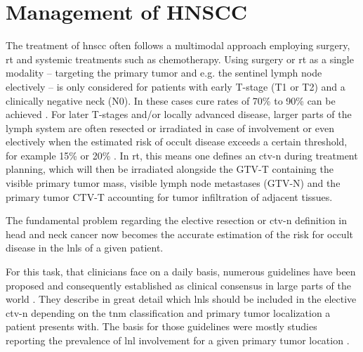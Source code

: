 \documentclass[\relativeRoot/main.tex]{subfiles}
\begin{document}
\section{Management of HNSCC}
\label{sec:intro:management}

The treatment of \gls{hnscc} often follows a multimodal approach employing surgery, \gls{rt} and systemic treatments such as chemotherapy. Using surgery or \acrlong{rt} as a single modality -- targeting the primary tumor and e.g. the sentinel lymph node electively -- is only considered for patients with early T-stage (T1 or T2) and a clinically negative neck (N0). In these cases cure rates of 70\% to 90\% can be achieved \cite{pfister_head_2014}. For later T-stages and/or locally advanced disease, larger parts of the lymph system are often resected or irradiated in case of involvement or even electively when the estimated risk of occult disease exceeds a certain threshold, for example 15\% or 20\% \cite{weiss_use_1997,pitman_rationale_2000,pillsbury_iii_rationale_1997}. In \acrlong{rt}, this means one defines an \gls{ctv-n} during treatment planning, which will then be irradiated alongside the GTV-T containing the visible primary tumor mass, visible lymph node metastases (GTV-N) and the primary tumor CTV-T accounting for tumor infiltration of adjacent tissues.

The fundamental problem regarding the elective resection or \gls{ctv-n} definition in head and neck cancer now becomes the accurate estimation of the risk for occult disease in the \glspl{lnl} of a given patient.

For this task, that clinicians face on a daily basis, numerous guidelines have been proposed and consequently established as clinical consensus in large parts of the world \cite{gregoire_ct-based_2003,gregoire_delineation_2014,gregoire_delineation_2018,gregoire_proposal_2006,gregoire_selection_2000,biau_selection_2019,eisbruch_intensity-modulated_2002,ferlito_elective_2009,vorwerk_guidelines_2011,chao_determination_2002}. They describe in great detail which \glspl{lnl} should be included in the elective \gls{ctv-n} depending on the \gls{tnm} classification and primary tumor localization a patient presents with. The basis for those guidelines were mostly studies reporting the prevalence of \gls{lnl} involvement for a given primary tumor location \cite{candela_patterns_1990,shah_patterns_1990,woolgar_histological_1999,woolgar_topography_2007,chao_determination_2002,vauterin_patterns_2006,razfar_incidence_2009,ho_patterns_2012}.
\end{document}

